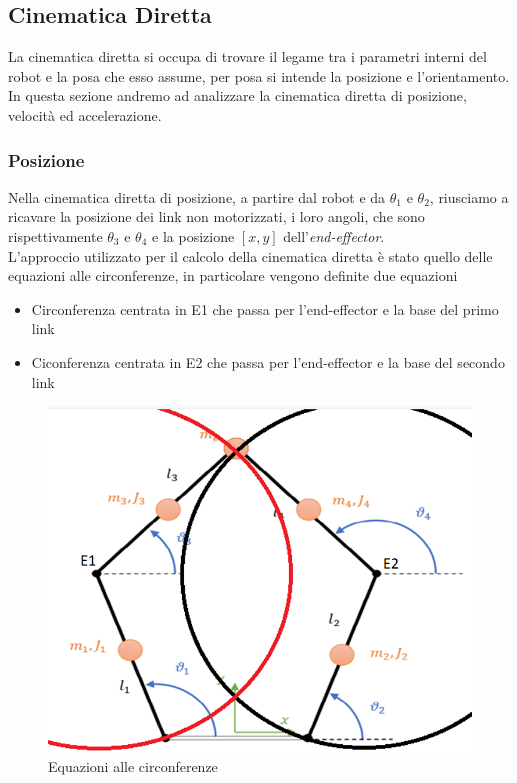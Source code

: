 \subsection{Cinematica Diretta}
La cinematica diretta si occupa di trovare il legame tra i parametri interni del robot e la posa che esso assume, per posa si intende la posizione e l'orientamento. In questa sezione andremo ad analizzare la cinematica diretta di posizione, velocità ed accelerazione.
\subsubsection{Posizione}\label{sec:Cinematica-pos}
Nella cinematica diretta di posizione, a partire dal robot e da $\theta_1$ e $\theta_2$, riusciamo a ricavare la posizione dei link non motorizzati, i loro angoli, che sono rispettivamente $\theta_3$ e $\theta_4$ e la posizione $[x,y]$ dell'\textit{end-effector}.
\\L'approccio utilizzato per il calcolo della cinematica diretta è stato quello delle equazioni alle circonferenze, in particolare vengono definite due equazioni
\begin{itemize}
	\item Circonferenza centrata in E1 che passa per l'end-effector e la base del primo link
	\item Ciconferenza centrata in E2 che passa per l'end-effector e la base del secondo link
\end{itemize}
\begin{figure}[ht]
	\begin{center}
		\includegraphics[scale=0.65]{Immagini/EqCirc}
		\caption{Equazioni alle circonferenze}
	\end{center}
\end{figure}
